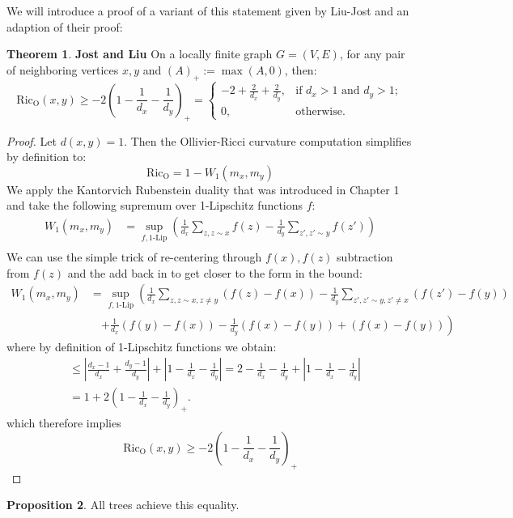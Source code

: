 \documentclass{Dissertate}
\theoremstyle{definition}
\newtheorem{theorem}{Theorem}[section]
\newtheorem{proposition}[theorem]{Proposition}
\theoremstyle{definition} %
\theoremstyle{definition}
\begin{document}
We will introduce a proof of a variant of this statement given by Liu-Jost and an adaption of  their proof:
\begin{theorem} \textbf{Jost and Liu} \cite{jost_olliviers_2014}
On a locally finite graph $G = (V,E)$,  for any pair of neighboring vertices $x, y$ and $(A)_+ := \operatorname{max}(A,0)$, then:
\[
\operatorname{Ric_O}(x, y) \geq -2 \left( 1 - \frac{1}{d_x} - \frac{1}{d_y} \right)_+ = 
\begin{cases} 
-2 + \frac{2}{d_x} + \frac{2}{d_y}, & \text{if } d_x > 1 \text{ and } d_y > 1; \\ 
0, & \text{otherwise}.
\end{cases}
\]
\end{theorem}
\begin{proof}
Let $d(x,y) =1$. Then the Ollivier-Ricci curvature computation simplifies by definition to: $$
\operatorname{Ric_O} = 1 - W_1(m_x, 
m_y)
$$
We apply the Kantorvich Rubenstein duality that was introduced in Chapter 1 and take the following supremum over 1-Lipschitz functions $f$: 
\begin{align*}
W_1(m_x, m_y) &= \sup_{f, 1\text{-Lip}} \left( \frac{1}{d_x} \sum_{z, z \sim x} f(z) - \frac{1}{d_y} \sum_{z', z' \sim y} f(z') \right) \\
\end{align*}
We can use the simple trick of re-centering through $f(x), f(z)$ subtraction from $f(z)$ and the add back in to get closer to the form in the bound:
\begin{align*}
W_1(m_x, m_y) &= \sup_{f, 1\text{-Lip}} \left( \frac{1}{d_x} \sum_{z, z \sim x, z \ne y} (f(z) - f(x)) - \frac{1}{d_y} \sum_{z', z' \sim y, z' \ne x} (f(z') - f(y)) \right. \\
&\quad \left. + \frac{1}{d_x} (f(y) - f(x)) - \frac{1}{d_y} (f(x) - f(y)) + (f(x) - f(y)) \right) 
\end{align*}
where by definition of 1-Lipschitz functions we obtain:
\begin{align*}
 &\le \left| \frac{d_x - 1}{d_x} + \frac{d_y - 1}{d_y} \right| + \left| 1 - \frac{1}{d_x} - \frac{1}{d_y} \right| = 2 - \frac{1}{d_x} - \frac{1}{d_y} + \left| 1 - \frac{1}{d_x} - \frac{1}{d_y} \right| \\
&= 1 + 2\left(1 - \frac{1}{d_x} - \frac{1}{d_y} \right)_+.
\end{align*}
which therefore implies
$$
\operatorname{Ric_O}(x, y) \geq -2 \left( 1 - \frac{1}{d_x} - \frac{1}{d_y} \right)_+
$$
\end{proof}
\begin{proposition} All trees achieve this equality. 
\end{proposition}
\end{document}
